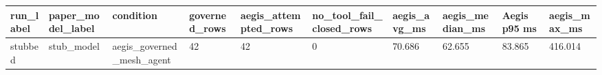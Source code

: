 \begin{tabular}{llllllllll}
 \hline
run\_label & paper\_model\_label & condition & governed\_rows & aegis\_attempted\_rows & no\_tool\_fail\_closed\_rows & aegis\_avg\_ms & aegis\_median\_ms & Aegis p95 ms & aegis\_max\_ms \\
 \hline
stubbed & stub\_model & aegis\_governed\_mesh\_agent & 42 & 42 & 0 & 70.686 & 62.655 & 83.865 & 416.014 \\
 \hline
\end{tabular}
